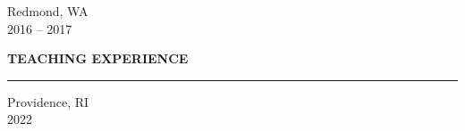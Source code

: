 \documentclass{resume} %
\begin{document}
\iffalse
\hspace*{3mm}- Conducted Prospective Clinico-Genomic (PCG) study with cross-functional team \\
\hspace*{3mm}- Developed system for sending data quality inquiries to study practices \\
\hspace*{3mm}- Managed an intern as a direct report through a 12 week project
\fi

\iffalse
\hspace*{3mm}- Collaborated in a highly cross-functional team to deliver 11 projects \\
\hspace*{3mm}- Built data pipelines to create oncological research datasets \\
\hspace*{3mm}- Designed and implemented tools to automate team processes
\fi


\hspace*{1mm}{\bf Microsoft } \hfill Redmond, WA \\
\hspace*{1mm}{\em Software Engineer, Azure Active Directory} \hfill 2016 -- 2017
\iffalse
\hspace*{3mm}- Refactored reporting features in Active Directory’s UI for performance and usability \\
\hspace*{3mm}- Updated the reporting service deployment system and deployed to sovereign clouds \\
\hspace*{3mm}- Maintained data pipeline that processed billions of events per month
\fi


\medskip
\MakeUppercase{{\bf Teaching Experience}}
\medskip
\hrule

\hspace*{1mm}{\bf Brown University } \hfill Providence, RI \\
\hspace*{1mm}{\em Teaching Assistant, Data Engineering} \hfill 2022
\end{document}
